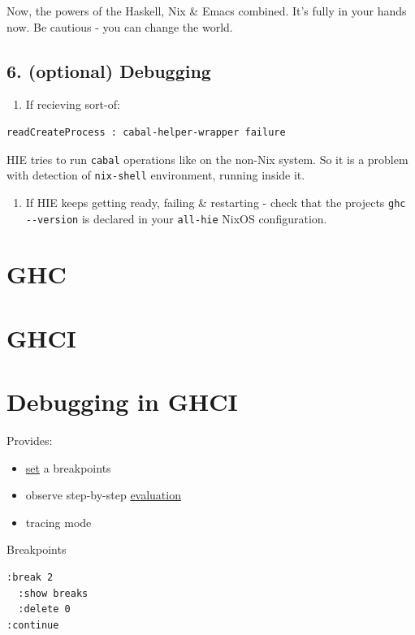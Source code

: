 \documentclass[a4paper,14pt,oneside]{book}
\begin{document}
Now, the powers of the Haskell, Nix \& Emacs combined. It's fully in your hands now. Be cautious - you can change the world.

\section{6. (optional) Debugging}
\label{sec:org14bc7d1}

\begin{enumerate}
\item If recieving sort-of:
\end{enumerate}

\begin{verbatim}
readCreateProcess : cabal-helper-wrapper failure
\end{verbatim}

HIE tries to run \texttt{cabal} operations like on the non-Nix system. So it is a problem with detection of \texttt{nix-shell} environment, running inside it.

\begin{enumerate}
\item If HIE keeps getting ready, failing \& restarting - check that the projects \texttt{ghc -{}-version} is declared in your \texttt{all-hie} NixOS configuration.
\end{enumerate}

\chapter{GHC}
\label{sec:orgc865460}
\chapter{GHCI}
\label{sec:orge007f76}
\chapter{Debugging in GHCI}
\label{sec:org2105b26}

Provides:
\begin{itemize}
\item \hyperref[org99b1186]{set} a breakpoints
\item observe step-by-step \hyperref[org3bf57d9]{evaluation}
\item tracing mode
\end{itemize}

Breakpoints
\begin{verbatim}
:break 2
  :show breaks
  :delete 0
:continue
\end{verbatim}
\end{document}
